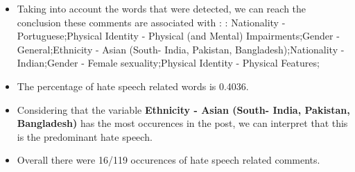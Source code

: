 \documentclass[11pt]{article}
\begin{document}
\begin{itemize}\item Taking into account the words that were detected, we can reach the conclusion these comments are associated with : : Nationality - Portuguese;Physical Identity - Physical (and Mental) Impairments;Gender - General;Ethnicity - Asian (South- India, Pakistan, Bangladesh);Nationality - Indian;Gender - Female sexuality;Physical Identity - Physical Features;%

\item The percentage of hate speech related words is 0.4036.

\item Considering that the variable \textbf{Ethnicity - Asian (South- India, Pakistan, Bangladesh)} has the most occurences in the post, we can interpret that this is the predominant hate speech.

\item Overall there were 16/119 occurences of hate speech related comments.\end{itemize}
\end{document}
